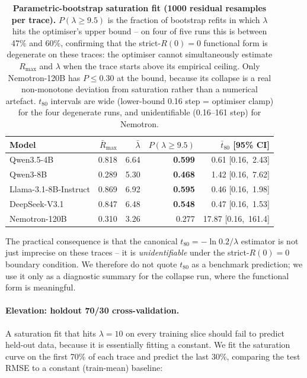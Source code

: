 \documentclass{article}
\begin{document}
\begin{table}[t]
  \centering
  \small
  \begin{tabular}{lrrrr}
    \toprule
    Model & $\bar R_{\max}$ & $\bar\lambda$ &
           $P(\lambda \ge 9.5)$ & $\bar t_{80}$ [95\% CI] \\
    \midrule
    Qwen3.5-4B            & 0.818 & 6.64 & \textbf{0.599} & 0.61 [0.16,\ 2.43] \\
    Qwen3-8B              & 0.289 & 5.30 & \textbf{0.468} & 1.42 [0.16,\ 7.62] \\
    Llama-3.1-8B-Instruct & 0.869 & 6.92 & \textbf{0.595} & 0.46 [0.16,\ 1.98] \\
    DeepSeek-V3.1         & 0.847 & 6.48 & \textbf{0.548} & 0.47 [0.16,\ 1.53] \\
    Nemotron-120B         & 0.310 & 3.26 & 0.277          & 17.87 [0.16,\ 161.4] \\
    \bottomrule
  \end{tabular}
  \caption{\textbf{Parametric-bootstrap saturation fit (1000 residual
    resamples per trace).}  $P(\lambda \ge 9.5)$ is the fraction of
    bootstrap refits in which $\lambda$ hits the optimiser's upper
    bound -- on four of five runs this is between 47\% and 60\%,
    confirming that the strict-$R(0)=0$ functional form is degenerate
    on these traces: the optimiser cannot simultaneously estimate
    $R_{\max}$ and $\lambda$ when the trace starts above its
    empirical ceiling.  Only Nemotron-120B has $P \le 0.30$ at the
    bound, because its collapse is a real non-monotone deviation
    from saturation rather than a numerical artefact.  $t_{80}$
    intervals are wide (lower-bound 0.16 step = optimiser clamp) for
    the four degenerate runs, and unidentifiable (0.16--161 step)
    for Nemotron.}
  \label{tab:scaling-bootstrap}
\end{table}

The practical consequence is that the canonical $t_{80} = -\ln 0.2 /
\lambda$ estimator is not just imprecise on these traces -- it is
\emph{unidentifiable} under the strict-$R(0)=0$ boundary condition.
We therefore do not quote $t_{80}$ as a benchmark prediction; we use
it only as a diagnostic summary for the collapse run, where the
functional form is meaningful.

\paragraph{Elevation: holdout 70/30 cross-validation.}
\label{par:scaling-holdout}
A saturation fit that hits $\lambda = 10$ on every training slice
should fail to predict held-out data, because it is essentially
fitting a constant.  We fit the saturation curve on the first 70\%
of each trace and predict the last 30\%, comparing the test RMSE to
a constant (train-mean) baseline:
\end{document}
